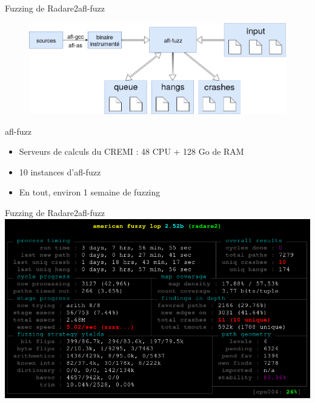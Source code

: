\begin{frame}{Fuzzing de Radare2}{afl-fuzz}
  \begin{figure}
    \includegraphics[width=0.98\linewidth]{../medias/afl-overview.png}
  \end{figure}

  \begin{exampleblock}{afl-fuzz}
    \begin{itemize}
    \item{Serveurs de calculs du CREMI : 48 CPU + 128 Go de RAM}
    \item{10 instances d'afl-fuzz}
    \item{En tout, environ 1 semaine de fuzzing}
    \end{itemize}
  \end{exampleblock}

\end{frame}

\begin{frame}{Fuzzing de Radare2}{afl-fuzz}
  \includegraphics[width=\linewidth]{../medias/afl-fuzz.png}
\end{frame}


